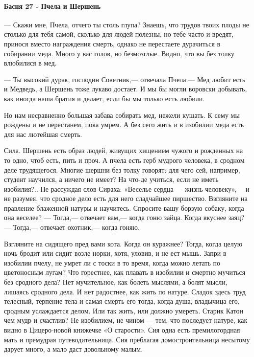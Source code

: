  
 
 
 
 

\paragraph{Басня 27 - Пчела и Шершень}

— Скажи мне, Пчела, отчего ты столь глупа? Знаешь, что трудов твоих плоды не
столько для тебя самой, сколько для людей полезны, но тебе часто и вредят,
принося вместо награждения смерть, однако не перестаете дурачиться в собирании
меда. Много у вас голов, но безмозглые. Видно, что вы без толку влюбилися в
мед.

— Ты высокий дурак, господин Советник,— отвечала Пчела.— Мед любит есть и
Медведь, а Шершень тоже лукаво достает. И мы бы могли воровски добывать, как
иногда наша братия и делает, если бы мы только есть любили.

Но нам несравненно большая забава собирать мед, нежели кушать. К сему мы
рождены и не перестанем, пока умрем. А без сего жить и в изобилии меда есть для
нас лютейшая смерть.

Сила. Шершень есть образ людей, живущих хищением чужого и рожденных на то одно,
чтоб есть, пить и проч. А пчела есть герб мудрого человека, в сродном деле
трудящегося. Многие шершни без толку говорят: для чего сей, например, студент
научился, а ничего не имеет? На что-де учиться, если не иметь изобилия?.. Не
рассуждая слов Сираха: «Веселье сердца — жизнь человеку»,— и не разумея, что
сродное дело есть для него сладчайшее пиршество. Взгляните на правление
блаженной натуры и научитесь. Спросите вашу борзую собаку, когда она веселее? —
Тогда,— отвечает вам,— когда гоню зайца. Когда вкуснее заяц? — Тогда,— отвечает
охотник,— когда гоняю.

Взгляните на сидящего пред вами кота. Когда он куражнее? Тогда, когда целую
ночь бродит или сидит возле норки, хотя, уловив, и не ест мышь. Запри в
изобилии пчелу, не умрет ли с тоски в то время, когда можно летать по
цветоносным лугам? Что горестнее, как плавать в изобилии и смертно мучиться без
сродного дела? Нет мучительное, как болеть мыслями, а болят мысли, лишаясь
сродного дела. И нет радостнее, как жить по натуре. Сладок здесь труд телесный,
терпение тела и самая смерть его тогда, когда душа, владычица его, сродным
услаждается делом. Или так жить, или должно умереть. Старик Катон чем мудр и
счастлив? Не изобилием, не чином — тем, что последует натуре, как видно в
Цицеро-новой книжечке «О старости». Сия одна есть премилогордная мать и
премудрая путеводительница. Сия преблагая домостроительница несытому дарует
много, а мало даст довольному малым.

